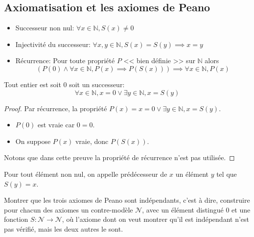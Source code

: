 \subsection{Axiomatisation et les axiomes de Peano}

\begin{definition}
	\begin{itemize}
		\item Successeur non nul: $\forall x \in \mathbb{N}, S(x) \neq 0$
		\item Injectivité du successeur: $\forall x,y \in \mathbb{N}, S(x) = S(y) \implies x = y$
		\item Récurrence: Pour toute propriété $P$ << bien définie >> sur $\mathbb{N}$ alors
		      $$ \left( P(0) \wedge \forall x \in \mathbb{N}, P(x) \implies P(S(x))\right) \implies \forall x \in \mathbb{N}, P(x) $$
	\end{itemize}
\end{definition}

\begin{lemma}
	Tout entier est soit $0$ soit un successeur:
	$$ \forall x \in \mathbb{N}, x = 0 \vee \exists y \in \mathbb{N}, x = S(y) $$
\end{lemma}

\begin{proof}
	Par récurrence, la propriété $P(x) = x = 0 \vee \exists y \in \mathbb{N}, x = S(y)$.
	\begin{itemize}
		\item $P(0)$ est vraie car $0 = 0$.
		\item On suppose $P(x)$ vraie, donc $P(S(x))$.
	\end{itemize}
	Notons que dans cette preuve la propriété de récurrence n'est pas utilisée.
\end{proof}


\begin{definition}[Prédécesseur]
	Pour tout élément non nul, on appelle prédécesseur de $x$ un élément $y$ tel que $S(y) = x$.
\end{definition}

\begin{exercice}
	Montrer que les trois axiomes de Peano sont indépendants, c'est à dire, construire pour chacun des axiomes un
	contre-modèle $\mathscr{N}$, avec un élément distingué $0$ et une fonction $S : \mathscr{N} \to \mathscr{N}$, où l’axiome dont on
	veut montrer qu’il est indépendant n’est pas vérifié, mais les deux autres le sont.
\end{exercice}
